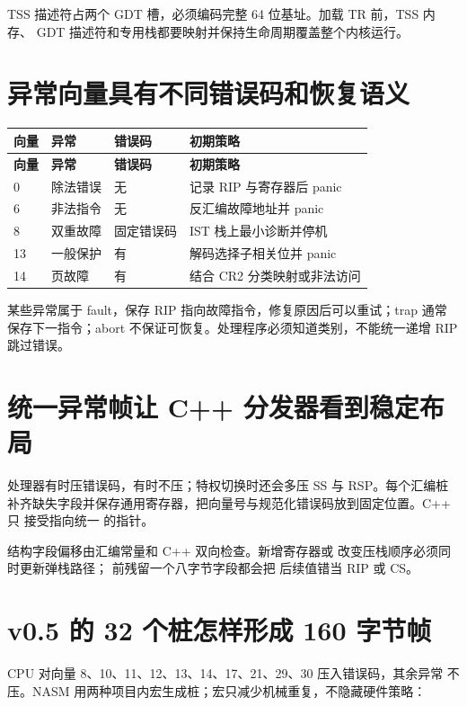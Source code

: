 TSS 描述符占两个 GDT 槽，必须编码完整 64 位基址。加载 TR 前，TSS 内存、
GDT 描述符和专用栈都要映射并保持生命周期覆盖整个内核运行。

\section{异常向量具有不同错误码和恢复语义}

\begin{longtable}{L{0.12\textwidth}L{0.22\textwidth}L{0.17\textwidth}L{0.37\textwidth}}
\toprule
\textbf{向量} & \textbf{异常} & \textbf{错误码} & \textbf{初期策略}\\
\midrule
\endfirsthead
\toprule
\textbf{向量} & \textbf{异常} & \textbf{错误码} & \textbf{初期策略}\\
\midrule
{} & 除法错误 & 无 & 记录 RIP 与寄存器后 panic\\
6 & 非法指令 & 无 & 反汇编故障地址并 panic\\
8 & 双重故障 & 固定错误码 & IST 栈上最小诊断并停机\\
13 & 一般保护 & 有 & 解码选择子相关位并 panic\\
14 & 页故障 & 有 & 结合 CR2 分类映射或非法访问\\
\bottomrule
\end{longtable}

某些异常属于 fault，保存 RIP 指向故障指令，修复原因后可以重试；trap 通常
保存下一指令；abort 不保证可恢复。处理程序必须知道类别，不能统一递增 RIP
跳过错误。

\section{统一异常帧让 C++ 分发器看到稳定布局}

处理器有时压错误码，有时不压；特权切换时还会多压 SS 与 RSP。每个汇编桩
补齐缺失字段并保存通用寄存器，把向量号与规范化错误码放到固定位置。C++ 只
接受指向统一  的指针。

结构字段偏移由汇编常量和 C++  双向检查。新增寄存器或
改变压栈顺序必须同时更新弹栈路径； 前残留一个八字节字段都会把
后续值错当 RIP 或 CS。

\section{v0.5 的 32 个桩怎样形成 160 字节帧}

CPU 对向量 8、10、11、12、13、14、17、21、29、30 压入错误码，其余异常
不压。NASM 用两种项目内宏生成桩；宏只减少机械重复，不隐藏硬件策略：

